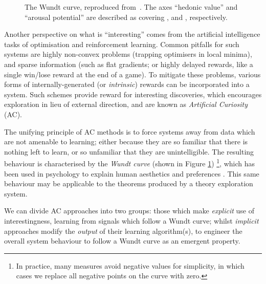 {\begin{figure}

  \caption{The Wundt curve, reproduced from~\cite{berlyne1970novelty}. The axes
    ``hedonic value'' and ``arousal potential'' are described as covering
    , and , respectively.}
  \label{fig:wundt}
\end{figure}

Another perspective on what is ``interesting'' comes from the artificial
intelligence tasks of optimisation and reinforcement learning. Common pitfalls
for such systems are highly non-convex problems (trapping optimisers in local
minima), and sparse information (such as flat gradients; or highly delayed
rewards, like a single win/lose reward at the end of a game). To mitigate these problems, various forms of internally-generated (or \emph{intrinsic}) rewards
can be incorporated into a system. Such schemes provide reward for interesting
discoveries, which encourages exploration in lieu of external direction, and are
known as \emph{Artificial Curiosity}~\cite{schmidhuber2006developmental} (AC).

The unifying principle of AC methods is to force systems away from data which
are not amenable to learning; either because they are so familiar that there is
nothing left to learn, or so unfamiliar that they are unintelligible. The
resulting behaviour is characterised by the \emph{Wundt curve} (shown in Figure \ref{fig:wundt}) \footnote{In practice, many measures
  avoid negative values for simplicity, in which cases we replace all negative
  points on the curve with zero.}, which has been used in psychology to explain
human aesthetics and preferences \cite{berlyne1970novelty}. This same behaviour
may be applicable to the theorems produced by a theory exploration system.

We can divide AC approaches into two groups: those which make \emph{explicit}
use of interestingness, learning from signals which follow a Wundt curve; whilst
\emph{implicit} approaches modify the \emph{output} of their learning
algorithm(s), to engineer the overall system behaviour to follow a Wundt curve
as an emergent property.

}
